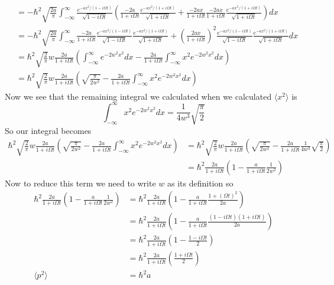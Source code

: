 \documentclass[11pt]{article}
\numberwithin{equation}{section}
\newcommand{\expt}[1]{\langle{#1}\rangle}
\begin{document}
\begin{enumerate}[(a)]
\begin{align*}
&= -\hbar^2\sqrt{\frac{2a}{\pi}}\int_{-\infty}^{\infty}\frac{e^{-ax^2/(1-i\Omega t)}}{\sqrt{1 - i\Omega t}}\left( \frac{-2a}{1+i\Omega t}\frac{e^{-ax^2/(1+i\Omega t)}}{\sqrt{1 + i\Omega t}} +\frac{-2ax}{1+i\Omega t}\frac{-2ax}{1+i\Omega t}\frac{e^{-ax^2/(1+i\Omega t)}}{\sqrt{1 + i\Omega t}} \right) dx\\
&= -\hbar^2\sqrt{\frac{2a}{\pi}}\int_{-\infty}^{\infty}\frac{-2a}{1+i\Omega t}\frac{e^{-ax^2/(1-i\Omega t)}}{\sqrt{1 - i\Omega t}}\frac{e^{-ax^2/(1+i\Omega t)}}{\sqrt{1 + i\Omega t}} + \left(\frac{2ax}{1+i\Omega t}\right)^2\frac{e^{-ax^2/(1-i\Omega t)}}{\sqrt{1 - i\Omega t}}\frac{e^{-ax^2/(1+i\Omega t)}}{\sqrt{1 + i\Omega t}}  dx\\
&= \hbar^2\sqrt{\frac{2}{\pi}}w\frac{2a}{1+i\Omega t}\left(\int_{-\infty}^{\infty}e^{-2w^2x^2}dx - \frac{2a}{1+i\Omega t}\int_{-\infty}^{\infty}x^2e^{-2w^2x^2} dx\right)\\
&= \hbar^2\sqrt{\frac{2}{\pi}}w\frac{2a}{1+i\Omega t}\left(\sqrt{\frac{\pi}{2w^2}} - \frac{2a}{1+i\Omega t}\int_{-\infty}^{\infty}x^2e^{-2w^2x^2} dx\right)
\end{align*}
Now we see that the remaining integral we calculated when we calculated $\expt{x^2}$ is 
$$\int_{-\infty}^{\infty}x^2e^{-2w^2x^2} dx = \frac{1}{4w^3}\sqrt{\frac{\pi}{2}}$$
So our integral becomes
\begin{align*}
\hbar^2\sqrt{\frac{2}{\pi}}w\frac{2a}{1+i\Omega t}\left(\sqrt{\frac{\pi}{2w^2}} - \frac{2a}{1+i\Omega t}\int_{-\infty}^{\infty}x^2e^{-2w^2x^2} dx\right) &= \hbar^2\sqrt{\frac{2}{\pi}}w\frac{2a}{1+i\Omega t}\left(\sqrt{\frac{\pi}{2w^2}} - \frac{2a}{1+i\Omega t}\frac{1}{4w^3}\sqrt{\frac{\pi}{2}}\right)\\
&= \hbar^2\frac{2a}{1+i\Omega t}\left(1 - \frac{a}{1+i\Omega t}\frac{1}{2w^2}\right)
\end{align*}
Now to reduce this term we need to write $w$ as its definition so
\begin{align*}
\hbar^2\frac{2a}{1+i\Omega t}\left(1 - \frac{a}{1+i\Omega t}\frac{1}{2w^2}\right) &= \hbar^2\frac{2a}{1+i\Omega t}\left(1 - \frac{a}{1+i\Omega t}\frac{1+(\Omega t)^2}{2a}\right)\\
&= \hbar^2\frac{2a}{1+i\Omega t}\left(1 - \frac{a}{1+i\Omega t}\frac{(1-i\Omega t)(1+i\Omega t)}{2a}\right)\\
&= \hbar^2\frac{2a}{1+i\Omega t}\left(1 - \frac{1-i\Omega t}{2}\right)\\
&= \hbar^2\frac{2a}{1+i\Omega t}\left(\frac{1+i\Omega t}{2}\right)\\
\expt{p^2} &= \hbar^2a

\end{align*}
\end{enumerate}
\end{document}
